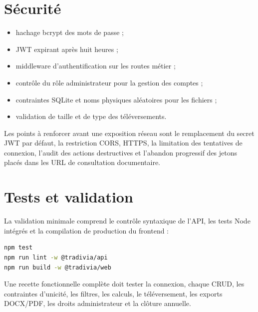\documentclass[12pt,a4paper,oneside]{report}
\begin{document}
\section{Sécurité}
\begin{itemize}
  \item hachage bcrypt des mots de passe ;
  \item JWT expirant après huit heures ;
  \item middleware d'authentification sur les routes métier ;
  \item contrôle du rôle administrateur pour la gestion des comptes ;
  \item contraintes SQLite et noms physiques aléatoires pour les fichiers ;
  \item validation de taille et de type des téléversements.
\end{itemize}
Les points à renforcer avant une exposition réseau sont le remplacement du secret JWT par défaut, la restriction CORS, HTTPS, la limitation des tentatives de connexion, l'audit des actions destructives et l'abandon progressif des jetons placés dans les URL de consultation documentaire.

\section{Tests et validation}
La validation minimale comprend le contrôle syntaxique de l'API, les tests Node intégrés et la compilation de production du frontend :
\begin{lstlisting}[language=bash,caption={Commandes de validation}]
npm test
npm run lint -w @tradivia/api
npm run build -w @tradivia/web
\end{lstlisting}
Une recette fonctionnelle complète doit tester la connexion, chaque CRUD, les contraintes d'unicité, les filtres, les calculs, le téléversement, les exports DOCX/PDF, les droits administrateur et la clôture annuelle.
\end{document}
